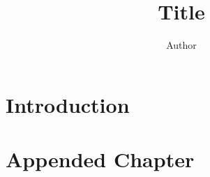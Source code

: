 \documentclass[a4paper,twoside]{report} %
\title{Title}   %
\author{Author}	%
\begin{document}
\maketitle

%
%
\begin{versionhistory}
\end{versionhistory}


\chapter{Introduction}	

\appendix			%
\chapter{Appended Chapter}	%
\end{document}
